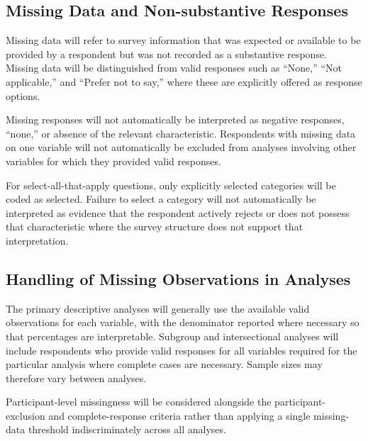 \subsection{Missing Data and Non-substantive Responses}

Missing data will refer to survey information that was expected or available to be provided by a respondent but was not recorded as a substantive response. Missing data will be distinguished from valid responses such as ``None,'' ``Not applicable,'' and ``Prefer not to say,'' where these are explicitly offered as response options.

Missing responses will not automatically be interpreted as negative responses, ``none,'' or absence of the relevant characteristic. Respondents with missing data on one variable will not automatically be excluded from analyses involving other variables for which they provided valid responses.

For select-all-that-apply questions, only explicitly selected categories will be coded as selected. Failure to select a category will not automatically be interpreted as evidence that the respondent actively rejects or does not possess that characteristic where the survey structure does not support that interpretation.


\subsection{Handling of Missing Observations in Analyses}

The primary descriptive analyses will generally use the available valid observations for each variable, with the denominator reported where necessary so that percentages are interpretable. Subgroup and intersectional analyses will include respondents who provide valid responses for all variables required for the particular analysis where complete cases are necessary. Sample sizes may therefore vary between analyses.

Participant-level missingness will be considered alongside the participant-exclusion and complete-response criteria rather than applying a single missing-data threshold indiscriminately across all analyses.


